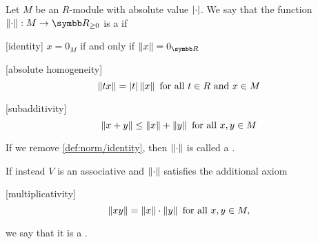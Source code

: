\begin{definition}\label{def:norm}
  Let \( M \) be an \( R \)-module with absolute value \( \left\vert \cdot \right\vert \). We say that the function \( \Norm{\cdot}: M \to \R_{\geq 0} \) is a  if
  \begin{description}
    [identity] \( x = 0_M \) if and only if \( \Norm x = 0_{\R} \)

    [absolute homogeneity]
    \begin{equation*}
      \left\Vert t x \right\Vert = \left\vert t \right\vert \left\Vert x \right\Vert \text{ for all } t \in R \text{ and } x \in M
    \end{equation*}

    [subadditivity] 
    \begin{equation*}
      \left\Vert x + y \right\Vert \leq \left\Vert x \right\Vert + \left\Vert y \right\Vert \text{ for all } x, y \in M
    \end{equation*}
  \end{description}

  If we remove \ref{def:norm/identity}, then \( \left\Vert \cdot \right\Vert \) is called a .

  If instead \( V \) is an associative and \( \left\Vert \cdot \right\Vert \) satisfies the additional axiom
  \begin{description}
    [multiplicativity]
    \begin{equation*}
      \left\Vert xy \right\Vert = \left\Vert x \right\Vert \cdot \left\Vert y \right\Vert \text{ for all } x, y \in M,
    \end{equation*}
  \end{description}
  we say that it is a .
\end{definition}

